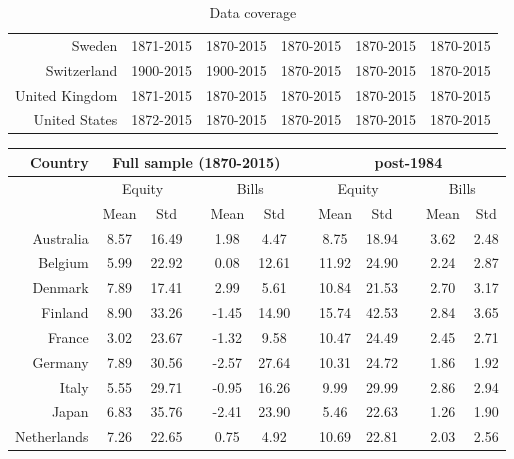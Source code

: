 {\begin{table}[H]
\begin{center}
\begin{tabular}{rccccc}
Sweden & 1871-2015 & 1870-2015 & 1870-2015 & 1870-2015 & 1870-2015 \\ 

Switzerland & 1900-2015 & 1900-2015 & 1870-2015 & 1870-2015 & 1870-2015 \\ 

United Kingdom & 1871-2015 & 1870-2015 & 1870-2015 & 1870-2015 & 1870-2015 \\ 

United States & 1872-2015 & 1870-2015 & 1870-2015 & 1870-2015 & 1870-2015 \\ 
\hline 
\hline
\end{tabular} 
\end{center}
\caption{Data coverage}
\label{tab:data_coverage}
\end{table}

{\renewcommand{\arraystretch}{1.0}
\begin{table}[H]
\begin{center}
\begin{tabular}{rccccccccccc}
\hline
\hline
Country & \multicolumn{5}{c}{Full sample (1870-2015)} & & \multicolumn{5}{c}{post-1984} \\
\hline
 & \multicolumn{2}{c}{Equity} & & \multicolumn{2}{c}{Bills} & & \multicolumn{2}{c}{Equity} & & \multicolumn{2}{c}{Bills}\\
\cline{2-3} \cline{5-6} \cline{8-9} \cline{11-12}
 & Mean & Std & & Mean & Std & & Mean & Std & & Mean & Std\\
\hline
Australia & 8.57 & 16.49 & & 1.98 & 4.47 & & 8.75 & 18.94 & & 3.62 & 2.48\\
Belgium & 5.99 & 22.92 & & 0.08 & 12.61 & & 11.92 & 24.90 & & 2.24 & 2.87 \\
Denmark & 7.89 & 17.41 & & 2.99 & 5.61 & & 10.84 & 21.53 & & 2.70 & 3.17 \\
Finland & 8.90 & 33.26 & & -1.45 & 14.90 & & 15.74 & 42.53 & & 2.84 & 3.65\\
France & 3.02 & 23.67 & & -1.32 & 9.58 & & 10.47 & 24.49 & & 2.45 & 2.71\\
Germany & 7.89 & 30.56 & & -2.57 & 27.64 & & 10.31 & 24.72 & & 1.86 & 1.92\\
Italy & 5.55 & 29.71& & -0.95 & 16.26 & & 9.99 & 29.99 & & 2.86 & 2.94\\
Japan & 6.83 & 35.76 & & -2.41 & 23.90 & & 5.46 & 22.63 & & 1.26 & 1.90\\
Netherlands & 7.26 & 22.65 & & 0.75 & 4.92 & & 10.69 & 22.81 & & 2.03 & 2.56 \\

\end{tabular}
\end{center}
\end{table}}}
